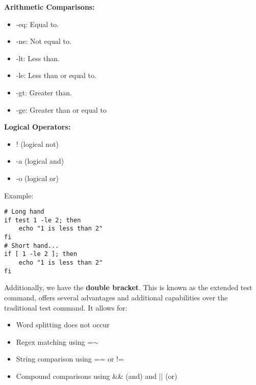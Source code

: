 \documentclass{report}
\begin{document}
    \pagebreak \bigbreak \noindent 
    \begin{minipage}[]{0.47\textwidth}
        \textbf{Arithmetic Comparisons:}
        \begin{itemize}
            \item -eq: Equal to.
            \item -ne: Not equal to.
            \item -lt: Less than.
            \item -le: Less than or equal to.
            \item -gt: Greater than.
            \item -ge: Greater than or equal to
        \end{itemize}
    
    \end{minipage}
    \begin{minipage}[]{0.47\textwidth}
        \textbf{Logical Operators:}
        \begin{itemize}
            \item ! (logical not)
            \item -a (logical and)
            \item -o (logical or)
        \end{itemize}
    \end{minipage}

    \bigbreak \noindent 
    Example:
    
    \begin{verbatim}
# Long hand
if test 1 -le 2; then
    echo "1 is less than 2"
fi
# Short hand...
if [ 1 -le 2 ]; then 
    echo "1 is less than 2"
fi
    \end{verbatim}
    \bigbreak \noindent
    
    \bigbreak \noindent 
    Additionally, we have the \textbf{double bracket}. This is known as the extended test command, offers several advantages and additional capabilities over the traditional test command. It allows for:
    \bigbreak \noindent 
    \begin{itemize}
        \item Word splitting does not occur
        \item Regex matching using =$\sim$
        \item String comparison using == or !=
        \item Compound comparisons using \&\& (and) and || (or)
    \end{itemize}
\end{document}

